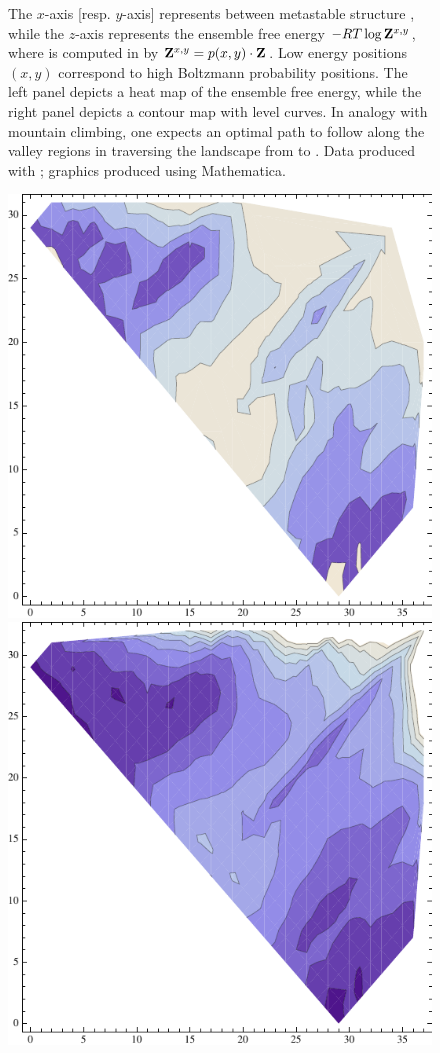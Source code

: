 \documentclass[11pt, oneside]{Thesis} %
\providecommand{\DIFdelbeginFL}{} %
\begin{document}
\begin{figure}[!ht]
{The $x$-axis [resp. $y$-axis]
represents \bpd between metastable structure ,
while the $z$-axis represents the ensemble free energy $-RT \log {\bf Z}^{x,y}_{}$,
where  is computed in \ffttwo by ${\bf Z}^{x,y}_{}=p(x,y) \cdot {\bf Z}^{}_{}$.
Low energy positions $(x,y)$ correspond to high Boltzmann probability positions.
The left panel depicts a heat map of the ensemble free energy,
while the right panel depicts a contour map with level curves. In analogy
with mountain climbing, one expects an optimal path to follow along the
valley regions in traversing the landscape from \strA to \strB. Data produced
with \ffttwo; graphics produced using Mathematica.
}
\label{fig:ffttwo:ffttwoProbContour}
\end{figure}

\begin{figure}[!ht]
\centering
\includegraphics[width=.45\textwidth]{Figures/FFTbor2D/rtwofoldProbContour.pdf}
\quad
\includegraphics[width=.45\textwidth]{Figures/FFTbor2D/rtwofoldEnsFreeEnergyContour.pdf}
\DIFdelbeginFL %

\end{figure}
\end{document}
